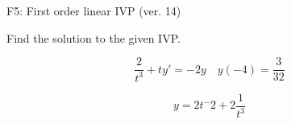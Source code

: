 \begin{exercise}
  \begin{exerciseTitle}F5: First order linear IVP (ver. 14)\end{exerciseTitle}
  \begin{exerciseStatement}
    
Find the solution to the given IVP.

    
\[\frac{2}{t^{3}} +ty'= -2 y \hspace{1em} y( -4 ) = \frac{3}{32}\]

  \end{exerciseStatement}
  \begin{exerciseAnswer}
    
\[y= 2 t^ -2 +2 \frac{1}{t^{3}}\]

  \end{exerciseAnswer}
\end{exercise}